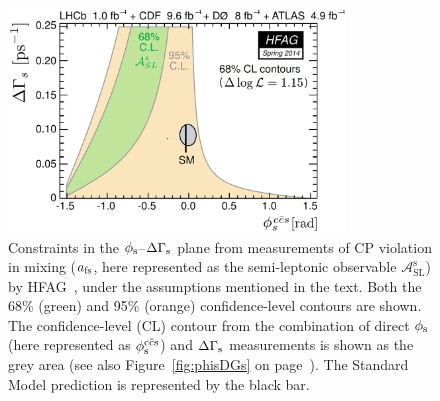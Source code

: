 \begin{figure}[tb]
  \centering
  \includegraphics[width=0.8\textwidth]{graphics/pheno/hfag_spr2014_DGsphis_asls-crop-cmyk}
  \caption{Constraints in the $\phi_\text{s}$--$\Delta\Gamma_\text{s}$ plane from measurements of CP violation in mixing ($a_\text{fs}$, here represented as
	   the semi-leptonic observable $\mathcal{A}_\text{SL}^\text{s}$) by HFAG~\cite{Amhis:2012bh},
           under the assumptions mentioned in the text.
           Both the 68\% (green) and 95\% (orange) confidence-level contours are shown.
           The confidence-level (CL) contour from the combination of direct $\phi_\text{s}$ (here represented as $\phisccs$) and $\Delta\Gamma_\text{s}$
           measurements is shown as the grey area (see also Figure~\ref{fig:phisDGs} on page~\pageref{fig:phisDGs}).
           The Standard Model prediction is represented by the black bar.}
  \label{fig:phisDGs_asls}
\end{figure}
